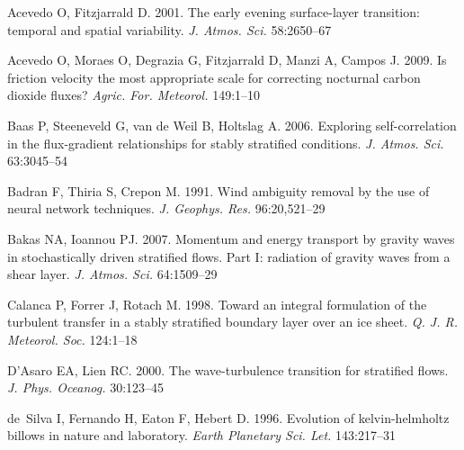 \documentclass{style/ar-1col}
\begin{document}
\begin{thebibliography}{00}

Acevedo O, Fitzjarrald D. 2001.
The early evening surface-layer transition: temporal and spatial variability.
\textit{J. Atmos. Sci.} 58:2650--67

Acevedo O, Moraes O, Degrazia G, Fitzjarrald D, Manzi A, Campos J. 2009.
Is friction velocity the most appropriate scale for correcting nocturnal carbon
  dioxide fluxes?
\textit{Agric. For. Meteorol.} 149:1--10

Baas P, Steeneveld G, {van de Weil} B, Holtslag A. 2006.
Exploring self-correlation in the flux-gradient relationships for stably
  stratified conditions.
\textit{J. Atmos. Sci.} 63:3045--54

Badran F, Thiria S, Crepon M. 1991.
Wind ambiguity removal by the use of neural network techniques.
\textit{J. Geophys. Res.} 96:20,521--29

Bakas NA, Ioannou PJ. 2007.
Momentum and energy transport by gravity waves in stochastically driven
  stratified flows. {Part I}: radiation of gravity waves from a shear layer.
\textit{J. Atmos. Sci.} 64:1509--29

Calanca P, Forrer J, Rotach M. 1998.
Toward an integral formulation of the turbulent transfer in a stably stratified
  boundary layer over an ice sheet.
\textit{Q. J. R. Meteorol. Soc.} 124:1--18

D'Asaro EA, Lien RC. 2000.
The wave-turbulence transition for stratified flows.
\textit{J. Phys. Oceanog.} 30:123--45

de~Silva I, Fernando H, Eaton F, Hebert D. 1996.
Evolution of kelvin-helmholtz billows in nature and laboratory.
\textit{Earth Planetary Sci. Let.} 143:217--31 

\end{thebibliography}
\end{document}
